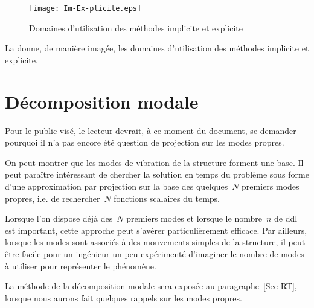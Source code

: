 \medskip
\begin{figure}[ht]
\centering\texttt{[image: Im-Ex-plicite.eps]}
\caption{Domaines d'utilisation des méthodes implicite et explicite}\label{Fig-Im-Ex-plicite}
\end{figure}
La  donne, de manière imagée, les domaines d'utilisation des méthodes implicite et explicite.


\ifVersionAvecExemplesSepares\else
\fi

\bigskip
\section{Décomposition modale}

Pour le public visé, le lecteur devrait, à ce moment du document, se demander pourquoi
il n'a pas encore été question de projection sur les modes propres.

\medskip
On peut montrer que les modes de vibration de la structure forment une base. Il peut
paraître intéressant de chercher la solution en temps du problème sous forme d'une
approximation par projection sur la base des quelques~$N$ premiers modes propres, i.e.
de rechercher~$N$ fonctions scalaires du temps.

Lorsque l'on dispose déjà des~$N$ premiers modes et lorsque le nombre~$n$ de ddl est important,
cette approche peut s'avérer particulièrement efficace.
Par ailleurs, lorsque les modes sont associés à des mouvements simples de la structure, il
peut être facile pour un ingénieur un peu expérimenté d'imaginer le nombre de modes à
utiliser pour représenter le phénomène.

\medskip
La méthode de la décomposition modale sera exposée au paragraphe~\ref{Sec-RT}, lorsque
nous aurons fait quelques rappels sur les modes propres.





